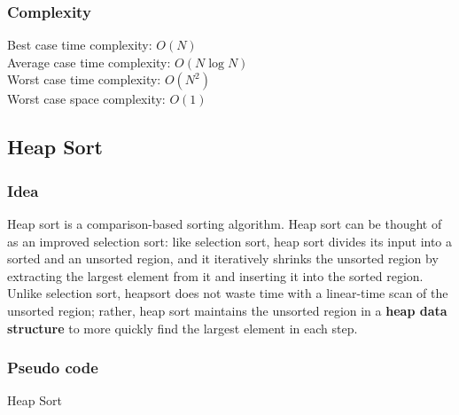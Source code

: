 \documentclass[11pt,a4paper]{article}
\newcommand\tab[1][1cm]{\hspace*{#1}}
\begin{document}
\subsubsection*{Complexity}
Best case time complexity: $O(N)$ \\
Average case time complexity: $O(N\log N)$\\
Worst case time complexity: $O(N^2)$ \\
Worst case space complexity: $O(1)$

\subsection{Heap Sort}
\subsubsection*{Idea}
\tab Heap sort is a comparison-based sorting algorithm. 
Heap sort can be thought of as an improved selection sort: like selection sort, heap sort divides its input into a sorted and an unsorted region, and it iteratively shrinks the unsorted region by extracting the largest element from it and inserting it into the sorted region. 
\newline
\tab Unlike selection sort, heapsort does not waste time with a linear-time scan of the unsorted region; rather, heap sort maintains the unsorted region 
in a \textbf{heap data structure} to more quickly find the largest element in each step.

\subsubsection*{Pseudo code}
\begin{algorithm2e}
  \SetAlgoLined


  \caption{Heap Sort}
\end{algorithm2e}
\end{document}
